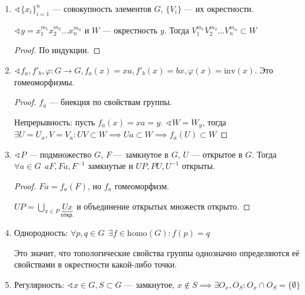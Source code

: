 \begin{prop}\itemfix
	\begin{enumerate}
		\item \(\sphericalangle \{x_i\}_{i=1}^n\) --- совокупность элементов \(G\),
		      \(\{V_i\}\) --- их окрестности.

		      \(\sphericalangle y = x_1^{m_1} x_2^{m_2} \ldots x_n^{m_n}\) и \(W\) --- окрестность \(y\). Тогда  \(V_1^{m_1} V_2^{m_2} \ldots V_n^{m_n} \subset W\)
		      \begin{proof}
			      По индукции.
		      \end{proof}

		\item \(\sphericalangle f_a, f'_b, \varphi : G \to G, f_a(x) = xa, f'_b(x) = bx, \varphi(x) = \mathrm{inv}(x)\). Это гомеоморфизмы.
		      \begin{proof}
			      \(f_a\) --- биекция по свойствам группы.

			      Непрерывность: пусть \(f_a(x) = xa = y\).
			      \(\sphericalangle W = W_y\), тогда \(\exists U = U_x, V = V_a : UV \subset W \implies Ua \subset W \implies f_a(U) \subset W\)
		      \end{proof}
		\item \(\sphericalangle P\) --- подмножество \(G\),
		      \(F\) --- замкнутое в  \(G\), \(U\) --- открытое в \(G\).
		      Тогда \(\forall a \in G \ \ aF, Fa, F^{-1}\) замкнутые и \(UP, PU, U^{-1}\) открыты.

		      \begin{proof}
			      \(Fa = f_a(F)\), но \(f_a\) гомеоморфизм.

			      \(UP = \bigcup_{x \in P} \underbrace{Ux}_{\text{откр.}}\) и объединение открытых множеств открыто.
		      \end{proof}
		\item Однородность:  \(\forall p, q \in G \ \ \exists f \in \mathrm{homo}(G) : f(p) = q\)

		      Это значит, что топологические свойства группы однозначно определяются её свойствами в окрестности какой-либо точки.

		\item Регулярность: \(\sphericalangle x \in G, S \subset G\) --- замкнутое, \(x \notin S \implies \exists O_x, O_S : O_x \cap O_S = \{\emptyset\}\)


\end{enumerate}
\end{prop}
